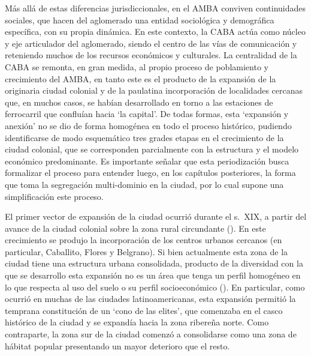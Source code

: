 \documentclass[
  spanish,
  a4paper,%
  chapterprefix=true,%
  DIV=calc,%
  twoside]{scrbook}%
\begin{document}
Más allá de estas diferencias jurisdiccionales, en el AMBA conviven
continuidades sociales, que hacen del aglomerado una entidad sociológica
y demográfica específica, con su propia dinámica. En este contexto, la
CABA actúa como núcleo y eje articulador del aglomerado, siendo el
centro de las vías de comunicación y reteniendo muchos de los recursos
económicos y culturales. La centralidad de la CABA se remonta, en gran
medida, al propio proceso de poblamiento y crecimiento del AMBA, en
tanto este es el producto de la expansión de la originaria ciudad
colonial y de la paulatina incorporación de localidades cercanas que, en
muchos casos, se habían desarrollado en torno a las estaciones de
ferrocarril que confluían hacia `la capital'. De todas formas, esta
`expansión y anexión' no se dio de forma homogénea en todo el proceso
histórico, pudiendo identificarse de modo esquemático tres grades etapas
en el crecimiento de la ciudad colonial, que se corresponden
parcialmente con la estructura y el modelo económico predominante. Es
importante señalar que esta periodización busca formalizar el proceso
para entender luego, en los capítulos posteriores, la forma que toma la
segregación multi-dominio en la ciudad, por lo cual supone una
simplificación este proceso.

El primer vector de expansión de la ciudad ocurrió durante el s.~XIX, a
partir del avance de la ciudad colonial sobre la zona rural circundante
(). En este crecimiento se produjo la incorporación de
los centros urbanos cercanos (en particular, Caballito, Flores y
Belgrano). Si bien actualmente esta zona de la ciudad tiene una
estructura urbana consolidada, producto de la diversidad con la que se
desarrollo esta expansión no es un área que tenga un perfil homogéneo en
lo que respecta al uso del suelo o su perfil socioeconómico
(). En particular, como ocurrió en muchas de las ciudades
latinoamericanas, esta expansión permitió la temprana constitución de un
`cono de las elites', que comenzaba en el casco histórico de la ciudad y
se expandía hacia la zona ribereña norte. Como contraparte, la zona sur
de la ciudad comenzó a consolidarse como una zona de hábitat popular
presentando un mayor deterioro que el resto.
\end{document}
